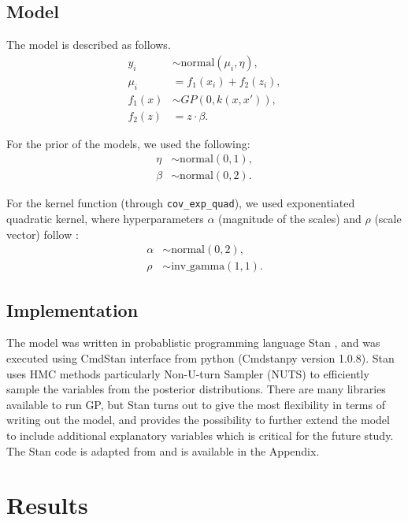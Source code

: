 \documentclass{article}
\begin{document}
\subsection*{Model}
The model is described as follows. 
\begin{align*}
    y_i &\sim \text{normal}(\mu_i, \eta),\\
    \mu_i &= f_1(x_i) + f_2(z_i),\\
    f_1(x) &\sim GP(0,k(x,x')),\\
    f_2(z) &= z\cdot \beta.
\end{align*}

For the prior of the models, we used the following:
\begin{align*}
    \eta &\sim \text{normal}(0,1),  \\
    \beta &\sim \text{normal}(0,2).
\end{align*}


For the kernel function (through \texttt{cov\_exp\_quad}), we used exponentiated quadratic kernel, where hyperparameters $\alpha$ (magnitude of the scales) and $\rho$ (scale vector) follow \cite{riutort2020practical}:
\begin{align*}
    \alpha &\sim \text{normal}(0,2),  \\
    \rho &\sim \text{inv\_gamma}(1,1).
\end{align*}



\subsection*{Implementation}
The model was written in probablistic programming language Stan \cite{carpenter2017stan,riutort2020practical}, and was executed using CmdStan interface from python (Cmdstanpy version 1.0.8). Stan uses HMC methods particularly Non-U-turn Sampler (NUTS) to efficiently sample the variables from the posterior distributions. There are many libraries available to run GP, but Stan turns out to give the most flexibility in terms of writing out the model, and provides the possibility to further extend the model to include additional explanatory variables which is critical for the future study. The Stan code is adapted from \cite{riutort2020practical} and is available in the Appendix. 




\section{Results}
\end{document}
